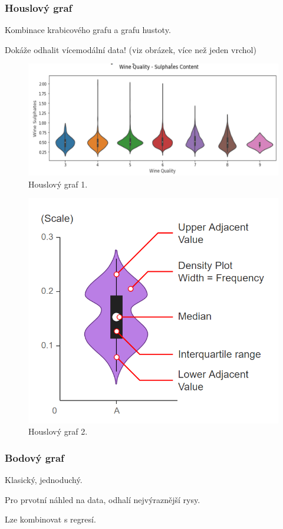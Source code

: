 \subsubsection{Houslový graf}

\begin{compactitem}
    \item Kombinace krabicového grafu a grafu hustoty.
    \item Dokáže odhalit vícemodální data! (viz obrázek, více než jeden vrchol)
\end{compactitem}

\begin{figure}[H]
    \centering
    \includegraphics[width=1\linewidth]{houslovy_graf_1.png}
    \caption{Houslový graf 1.}
\end{figure}

\begin{figure}[H]
    \centering
    \includegraphics[width=0.5\linewidth]{houslovy_graf_2.png}
    \caption{Houslový graf 2.}
\end{figure}

\subsubsection{Bodový graf}

\begin{compactitem}
    \item Klasický, jednoduchý.
    \item Pro prvotní náhled na data, odhalí nejvýraznější rysy.
    \item Lze kombinovat s regresí.
\end{compactitem}

